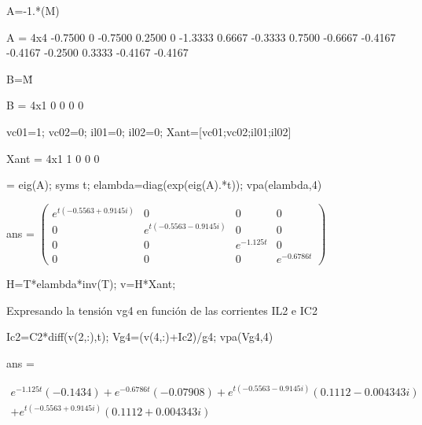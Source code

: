 \documentclass[10pt,a4paper]{article} %
\begin{document}
	\begin{matlabcode}
	A=-1.*(M\N)
	\end{matlabcode}
	\begin{matlaboutput}
	A = 4x4    
	-0.7500         0   -0.7500    0.2500
	0   -1.3333    0.6667   -0.3333
	0.7500   -0.6667   -0.4167   -0.4167
	-0.2500    0.3333   -0.4167   -0.4167
	
	\end{matlaboutput}
	\begin{matlabcode}
	B=M\u
	\end{matlabcode}
	\begin{matlaboutput}
	B = 4x1    
	0
	0
	0
	0
	
	\end{matlaboutput}
	\begin{matlabcode}
	vc01=1;
	vc02=0;
	il01=0;
	il02=0;
	Xant=[vc01;vc02;il01;il02]
	\end{matlabcode}
	\begin{matlaboutput}
	Xant = 4x1    
	1
	0
	0
	0
	
	\end{matlaboutput}
	\begin{matlabcode}
	[T, lambda] = eig(A);
	syms t;
	elambda=diag(exp(eig(A).*t));
	vpa(elambda,4)
	\end{matlabcode}
	\begin{matlabsymbolicoutput}
	ans = 
	$\displaystyle \left(\begin{array}{cccc}
	e^{t {\left(-0.5563+0.9145 i\right)}}  & 0 & 0 & 0\\
	0 & e^{t {\left(-0.5563-0.9145 i\right)}}  & 0 & 0\\
	0 & 0 & e^{-1.125 t}  & 0\\
	0 & 0 & 0 & e^{-0.6786 t} 
	\end{array}\right)$
	\end{matlabsymbolicoutput}
	\begin{matlabcode}
	H=T*elambda*inv(T);
	v=H*Xant;
	\end{matlabcode}
	
	
	\begin{par}
	\begin{flushleft}
	Expresando la tensión vg4 en función de las corrientes IL2 e IC2
	\end{flushleft}
	\end{par}
	
	\begin{matlabcode}
	Ic2=C2*diff(v(2,:),t);
	Vg4=(v(4,:)+Ic2)/g4;
	vpa(Vg4,4)
	\end{matlabcode}
	\begin{matlabsymbolicoutput}
	ans = 
	\end{matlabsymbolicoutput}
	\begin{equation*}
	\begin{split}
		e^{-1.125 t}  {\left(-0.1434\right)}+e^{-0.6786 t}  {\left(-0.07908\right)}+e^{t {\left(-0.5563-0.9145 i\right)}}  {\left(0.1112-0.004343 i\right)}\\
	+e^{t {\left(-0.5563+0.9145 i\right)}}  {\left(0.1112+0.004343 i\right)}
	\end{split}
	\end{equation*}
	
\end{document}

